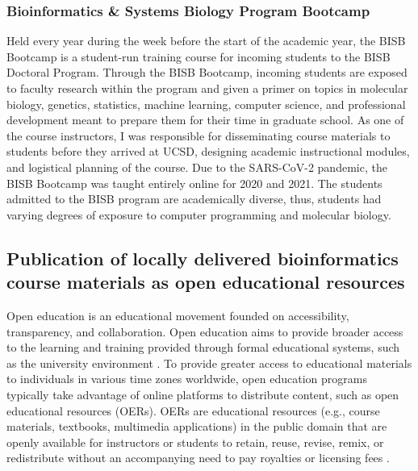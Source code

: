 \subsubsection{Bioinformatics \& Systems Biology Program Bootcamp}
Held every year during the week before the start of the academic year, the BISB Bootcamp is a student-run training course for incoming students to the BISB Doctoral Program. Through the BISB Bootcamp, incoming students are exposed to faculty research within the program and given a primer on topics in molecular biology, genetics, statistics, machine learning, computer science, and professional development meant to prepare them for their time in graduate school. As one of the course instructors, I was responsible for disseminating course materials to students before they arrived at UCSD, designing academic instructional modules, and logistical planning of the course. Due to the SARS-CoV-2 pandemic, the BISB Bootcamp was taught entirely online for 2020 and 2021. The students admitted to the BISB program are academically diverse, thus, students had varying degrees of exposure to computer programming and molecular biology.

\subsection{Publication of locally delivered bioinformatics course materials as open educational resources}

Open education is an educational movement founded on accessibility, transparency, and collaboration. Open education aims to provide broader access to the learning and training provided through formal educational systems, such as the university environment \cite{weller2014,mishra2017,hylen,abri2018,colvard2019}. To provide greater access to educational materials to individuals in various time zones worldwide, open education programs typically take advantage of online platforms to distribute content, such as open educational resources (OERs). OERs are educational resources (e.g., course materials, textbooks, multimedia applications) in the public domain that are openly available for instructors or students to retain, reuse, revise, remix, or redistribute without an accompanying need to pay royalties or licensing fees \cite{islim2016,geith2008,moore2022,colvard2019,abri2018,hylen,mishra2017,weller2014}.  

